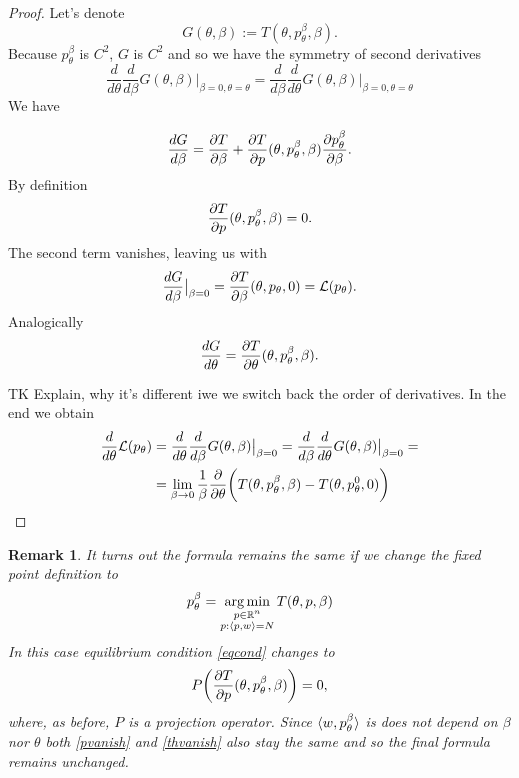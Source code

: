 \documentclass[a4paper,10.5pt]{report}
\newtheorem{remark}{Remark}
\begin{document}
\begin{proof} Let's denote
 \begin{equation}
 G(\theta, \beta) := T(\theta, p_\theta^\beta, \beta).
\end{equation}
Because $p_\theta^\beta$ is $C^2$, $G$ is $C^2$ and so we have the symmetry of second derivatives
\begin{equation}
 \frac{d}{d\theta}\frac{d}{d\beta}G(\theta,\beta)\big|_{\beta=0, \theta = \theta} =\frac{d}{d\beta}\frac{d}{d\theta}G(\theta,\beta)\big|_{\beta=0, \theta = \theta}
\end{equation}
We have

\begin{equation}\label{eqcond}
 \frac{dG}{d\beta} = \frac{\partial T}{\partial \beta} + \frac{\partial T}{\partial p}(\theta,p_\theta^{\beta}, \beta)\frac{\partial p_\theta^{\beta}}{\partial \beta}.
\end{equation}
By definition
\begin{equation}
\frac{\partial T}{\partial p}(\theta,p_\theta^{\beta}, \beta)=0.
\end{equation}
The second term vanishes, leaving us with
\begin{equation}\label{pvanish}
  \frac{dG}{d\beta}\big|_{\beta=0} = \frac{\partial T}{\partial \beta}(\theta, p_\theta, 0)=\mathcal{L}(p_\theta).
\end{equation}
Analogically
\begin{equation}\label{thvanish}
 \frac{dG}{d\theta}=\frac{\partial T}{\partial \theta}(\theta, p_\theta^{\beta}, \beta).
\end{equation}

TK Explain, why it's different iwe we switch back the order of derivatives.
In the end we obtain
\begin{align}
 \frac{d}{d\theta} \mathcal{L}(p_\theta) &=\frac{d}{d\theta}\frac{d}{d\beta}G(\theta,\beta)\big|_{\beta=0} = \frac{d}{d\beta}\frac{d}{d\theta}G(\theta,\beta)\big|_{\beta=0}=\\
 &=\lim_{\beta \to 0}\frac{1}{\beta} \frac{\partial }{\partial \theta} \bigg(T(\theta, p_\theta^\beta,\beta) - T(\theta, p_\theta^0, 0)\bigg)
\end{align}

\end{proof}

\begin{remark}
 It turns out the formula remains the same if we change the fixed point definition to
\begin{equation}
 p_\theta^\beta = \operatorname*{arg\,min}_{\substack{p \in \mathbb{R}^n \\ p: \langle p, w \rangle=N }} T(\theta, p, \beta)
\end{equation}
In this case equilibrium condition \ref{eqcond} changes to
\begin{equation*}
P\bigg(\frac{\partial T}{\partial p}(\theta,p_\theta^{\beta}, \beta)\bigg)=0,
\end{equation*}
where, as before, $P$ is a projection operator. Since $\langle w, p_\theta^{\beta} \rangle$ is does not depend on $\beta$ nor $\theta$ both \ref{pvanish} and \ref{thvanish} also stay the same and so the final formula remains unchanged.

\end{remark}
\end{document}
